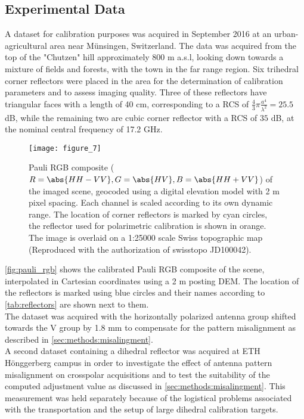 \subsection{Experimental Data}\label{sec:methods:data}
A dataset for calibration purposes was acquired in September 2016 at an urban-agricultural area near M\"{u}nsingen, Switzerland. The data was acquired from the top of the "Chutzen" hill approximately 800 m a.s.l, looking down towards a mixture of fields and forests, with the town in the far range region. Six trihedral corner reflectors were placed in the area for the determination of calibration parameters and to assess imaging quality. Three of these reflectors have triangular faces with a length of 40 cm, corresponding to a RCS of $\frac{4}{3}\pi \frac{a^4}{\lambda^2}=25.5 $ dB, while the remaining two are cubic corner reflector with a RCS of $35$ dB, at the nominal central frequency of 17.2 GHz.
\begin{figure}[ht]
	\centering
	\texttt{[image: figure\_7]}
	\caption{Pauli RGB composite ($R=\abs{HH-VV},G=\abs{HV},B=\abs{HH+VV}$) of the imaged scene, geocoded using a digital elevation model with 2 m pixel spacing. Each channel is scaled according to its own dynamic range. The location of corner reflectors is marked by cyan circles, the reflector used for polarimetric calibration is shown in orange. The image is overlaid on a 1:25000 scale Swiss topographic map (Reproduced with the authorization of swisstopo  JD100042).}
	\label{fig:pauli_rgb}
\end{figure}
\autoref{fig:pauli_rgb} shows the calibrated Pauli RGB composite of the scene, interpolated in Cartesian coordinates using a 2 m posting DEM.  The location of the reflectors  is marked using blue circles and their names according to \autoref{tab:reflectors} are shown next to them.\\
The dataset was acquired with the horizontally polarized antenna group shifted towards the V group by 1.8 mm to compensate for the pattern misalignment as described in \autoref{sec:methods:misalingment}.\\
A second dataset containing a dihedral reflector was acquired at ETH H\"{o}nggerberg campus in order to investigate the effect of antenna pattern misalignment on crosspolar acquisitions and to test the suitability of the computed adjustment value as discussed in \autoref{sec:methods:misalingment}. This measurement was held separately because of the logistical problems associated with the transportation and the setup of large dihedral calibration targets.
